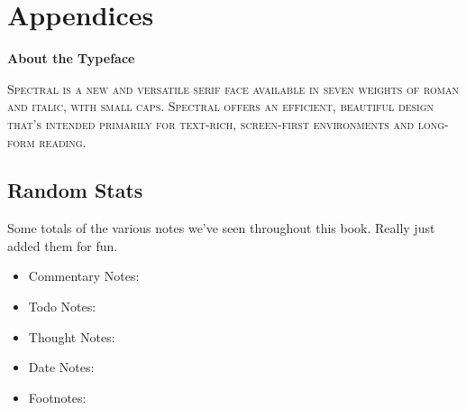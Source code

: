 \setcounter{footnote}{0}
\setcounter{section}{1}



\mainmatter
\renewcommand{\thefootnote}{\arabic{footnote}}











\part*{Appendices}
\appendix


\newpage
\backmatter

\titleformat{\chapter}[hang]{\Large}{\filright\enspace\thechapter\enspace}{2.5cm}{\Large\bfseries\filcenter}
\printbibliography

\newpage
{}
\vspace*{0.15\paperheight}
\begin{center}\bfseries
About the Typeface
\end{center}
\noindent\hfil\parbox[c][1.1\height][c]{0.5\textwidth}{\small\scshape
Spectral is a new and versatile serif face available in seven weights of roman and italic, with small caps.
Spectral offers an efficient, beautiful design that’s intended primarily for text-rich, screen-first environments and long-form reading.}
\vspace*{\fill}

\newpage
\titleformat{\chapter}[frame]{\Large}{\filright\enspace\thechapter\enspace}{1.5cm}{\Large\bfseries\filcenter}
\chapter{Random Stats}
Some totals of the various notes we've seen throughout this book.
Really just added them for fun.
\begin{itemize}\scshape\large
    \item Commentary Notes: \thecommcounter
    \item Todo Notes: \thetodocounter
    \item Thought Notes: \thethoughtcounter
    \item Date Notes: \thedatecounter
    \item Footnotes: \thefootcounter
\end{itemize}

